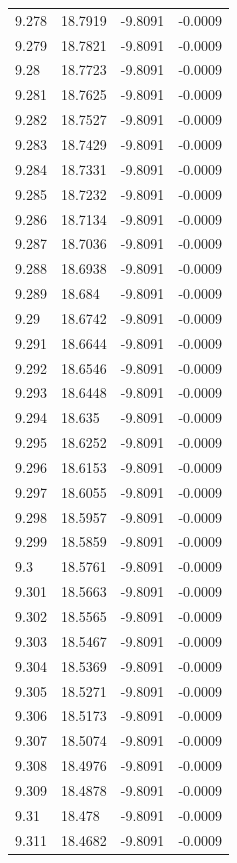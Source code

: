 \begin{tabular}{llll}
9.278 & 18.7919 & -9.8091 & -0.0009 \\
9.279 & 18.7821 & -9.8091 & -0.0009 \\
9.28 & 18.7723 & -9.8091 & -0.0009 \\
9.281 & 18.7625 & -9.8091 & -0.0009 \\
9.282 & 18.7527 & -9.8091 & -0.0009 \\
9.283 & 18.7429 & -9.8091 & -0.0009 \\
9.284 & 18.7331 & -9.8091 & -0.0009 \\
9.285 & 18.7232 & -9.8091 & -0.0009 \\
9.286 & 18.7134 & -9.8091 & -0.0009 \\
9.287 & 18.7036 & -9.8091 & -0.0009 \\
9.288 & 18.6938 & -9.8091 & -0.0009 \\
9.289 & 18.684 & -9.8091 & -0.0009 \\
9.29 & 18.6742 & -9.8091 & -0.0009 \\
9.291 & 18.6644 & -9.8091 & -0.0009 \\
9.292 & 18.6546 & -9.8091 & -0.0009 \\
9.293 & 18.6448 & -9.8091 & -0.0009 \\
9.294 & 18.635 & -9.8091 & -0.0009 \\
9.295 & 18.6252 & -9.8091 & -0.0009 \\
9.296 & 18.6153 & -9.8091 & -0.0009 \\
9.297 & 18.6055 & -9.8091 & -0.0009 \\
9.298 & 18.5957 & -9.8091 & -0.0009 \\
9.299 & 18.5859 & -9.8091 & -0.0009 \\
9.3 & 18.5761 & -9.8091 & -0.0009 \\
9.301 & 18.5663 & -9.8091 & -0.0009 \\
9.302 & 18.5565 & -9.8091 & -0.0009 \\
9.303 & 18.5467 & -9.8091 & -0.0009 \\
9.304 & 18.5369 & -9.8091 & -0.0009 \\
9.305 & 18.5271 & -9.8091 & -0.0009 \\
9.306 & 18.5173 & -9.8091 & -0.0009 \\
9.307 & 18.5074 & -9.8091 & -0.0009 \\
9.308 & 18.4976 & -9.8091 & -0.0009 \\
9.309 & 18.4878 & -9.8091 & -0.0009 \\
9.31 & 18.478 & -9.8091 & -0.0009 \\
9.311 & 18.4682 & -9.8091 & -0.0009 \\

\end{tabular}
